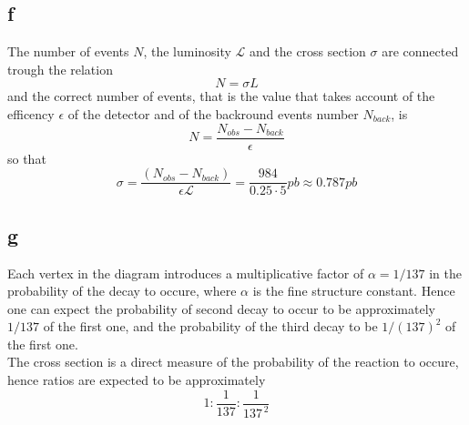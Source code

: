 \subsection*{f}
The number of events $N$, the luminosity $\mathcal{L}$ and the cross section $\sigma$ are connected trough the relation
\begin{equation*}
    N = \sigma L
\end{equation*}
and the correct number of events, that is the value that takes account of the efficency $\epsilon$ of the detector and of the backround events number $N_{back}$, is
\begin{equation*}
    N = \frac{N_{obs} - N_{back}}{\epsilon}
\end{equation*}
so that
\begin{equation*}
\sigma= \frac{(N_{obs}-N_{back})}{\epsilon \mathcal{L}} = \frac{984}{0.25 \cdot 5} pb \approx 0.787 pb
\end{equation*} 

\subsection*{g}
Each vertex in the diagram introduces a multiplicative factor of $\alpha = 1/137$ in the probability of the decay to occure, where $\alpha$ is the fine structure constant.
Hence one can expect the probability of second decay to occur to be approximately $1/137$ of the first one, and the probability of the third decay to be $1/(137)^2$ of the first one. \\
The cross section is a direct measure of the probability of the reaction to occure, hence ratios are expected to be approximately
\begin{equation*}
    1 : \frac{1}{137} : \frac{1}{137^{\, 2}}
\end{equation*}